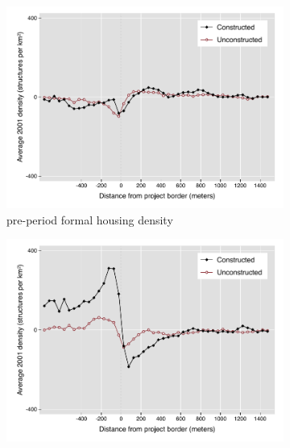 \documentclass[12pt]{article}
\begin{document}
\begin{figure}[h!]
        \centering
        \caption[ Pre-Period Housing Densities in Constructed and Unconstructed Projects Areas ]
        {\small around 5,200 1km Square Fixed Effects, each with 400 grid cells within  Pre-Period Housing Densities in Constructed and Unconstructed projects } 
        \begin{subfigure}[b]{0.495\textwidth}
            \centering
            \includegraphics[width=\textwidth,trim={0.3cm .3cm 0.1cm 0cm}, clip=true]{figures/bblu_for_pre_means_4_10k.pdf}
            \caption[Network2]%
            {{\small pre-period formal housing density}}    
            \label{fig:prefor}
        \end{subfigure}
        \hfill
        \begin{subfigure}[b]{0.495\textwidth}  
            \centering 
            \includegraphics[width=\textwidth,trim={0.3cm .3cm 0.1cm 0cm}, clip=true]{figures/bblu_inf_pre_means_4_10k.pdf}

\end{subfigure}
\end{figure}
\end{document}
